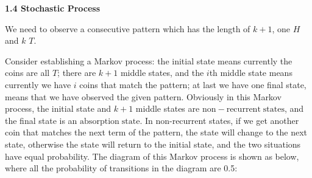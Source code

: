 \documentclass[12pt]{article}
\begin{document}
\bigskip
{\large \bf 1.4 Stochastic Process}
\par

We need to observe a consecutive pattern which has the length of $k+1$, one $H$ and $k$ $T$.
\par 
Consider establishing a Markov process: the initial state means currently the coins are all $T$; there are $k+1$ middle states, and the $i$th middle state means currently we have $i$ coins that match the pattern; at last we have one final state, means that we have observed the given pattern. Obviously in this Markov process, the initial state and $k+1$ middle states are $\bm{\mathrm{non-recurrent\;states}}$, and the final state is an $\bm{\mathrm{absorption\;state}}$. In non-recurrent states, if we get another coin that matches the next term of the pattern, the state will change to the next state, otherwise the state will return to the initial state, and the two situations have equal probability. The diagram of this Markov process is shown as below, where all the probability of transitions in the diagram are 0.5:
\end{document}
